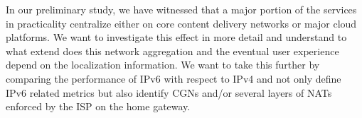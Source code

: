 In our preliminary study, we have witnessed that a major portion of the
services in practicality centralize either on core content delivery networks
or major cloud platforms. We want to investigate this effect in more detail
and understand to what extend does this network aggregation and the eventual
user experience depend on the localization information. We want to take this
further by comparing the performance of IPv6 with respect to IPv4 and not only
define IPv6 related metrics but also identify \ac{CGN}s and/or several layers
of \ac{NAT}s enforced by the \ac{ISP} on the home gateway.

